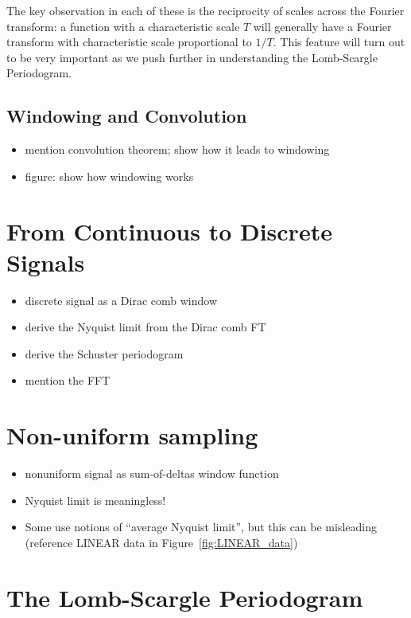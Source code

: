 \documentclass[preprint]{aastex}
\newcommand{\Fig}[1]{Figure~\ref{fig:#1}}
\newcommand{\fig}[1]{\Fig{#1}}
\begin{document}
The key observation in each of these is the reciprocity of scales across the
Fourier transform: a function with a characteristic scale $T$ will generally
have a Fourier transform with characteristic scale proportional to $1/T$.
This feature will turn out to be very important as we push further in
understanding the Lomb-Scargle Periodogram.

\subsection{Windowing and Convolution}

\begin{itemize}
  \item mention convolution theorem; show how it leads to windowing
  \item figure: show how windowing works
\end{itemize}


\section{From Continuous to Discrete Signals}

\begin{itemize}
  \item discrete signal as a Dirac comb window
  \item derive the Nyquist limit from the Dirac comb FT
  \item derive the Schuster periodogram
  \item mention the FFT
\end{itemize}


\section{Non-uniform sampling}

\begin{itemize}
  \item nonuniform signal as sum-of-deltas window function
  \item Nyquist limit is meaningless!
  \item Some use notions of ``average Nyquist limit'', but this can be misleading (reference LINEAR data in \fig{LINEAR_data})
\end{itemize}


\section{The Lomb-Scargle Periodogram}
\end{document}
